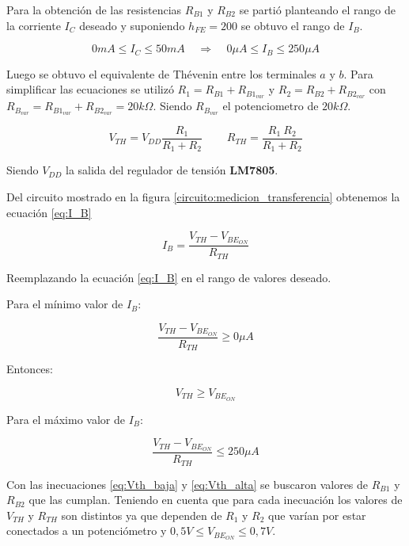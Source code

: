 \documentclass[10pt,spanish,a4paper,openany,notitlepage]{article}
\begin{document}
Para la obtención de las resistencias $R_{B1}$ y $R_{B2}$ se partió 
planteando el rango de la corriente $I_C$ deseado y suponiendo $h_{FE} = 200$ 
se obtuvo el rango de $I_B$.

\[ \displaystyle 0 \unit{mA} \leq I_C \leq 50\unit{mA} \ \ \ \ \ \Longrightarrow \ \ \ \ \  0 \unit{\mu A} \leq I_B \leq 250 \unit{\mu A} \]

Luego se obtuvo el equivalente de Thévenin entre los terminales $a$ y $b$. 
Para simplificar las ecuaciones se utilizó $R_1 = R_{B1} + R_{B1_{var}}$ y 
$R_2 = R_{B2} + R_{B2_{var}}$ con $R_{B_{var}} = R_{B1_{var}} + R_{B2_{var}} = 20 \unit{k\Omega}$. 
Siendo $R_{B_{var}}$ el potenciometro de $20 \unit{k\Omega}$.

\[ \displaystyle V_{TH} = V_{DD} \frac{R_1}{R_1 + R_2}\ \ \ \ \ \ \ \ \ \ R_{TH} = \frac{R_1\ R_2}{R_1 + R_2}\]

Siendo $V_{DD}$ la salida del regulador de tensión \textbf{LM7805}. 

Del circuito mostrado en la figura \ref{circuito:medicion_transferencia} 
obtenemos la ecuación \ref{eq:I_B}

\begin{equation}
\displaystyle I_B = \frac{V_{TH} - V_{BE_{ON}}}{R_{TH}}
\label{eq:I_B}
\end{equation}

Reemplazando la ecuación \ref{eq:I_B} en el rango de valores deseado.

Para el mínimo valor de $I_B$:

\[ \displaystyle \frac{V_{TH} - V_{BE_{ON}}}{R_{TH}} \geq 0 \unit{\mu A} \]

Entonces:

\begin{equation}
V_{TH} \geq V_{BE_{ON}}
\label{eq:Vth_baja}
\end{equation}

Para el máximo valor de $I_B$:

\begin{equation}
\frac{V_{TH} - V_{BE_{ON}}}{R_{TH}} \leq 250 \unit{\mu A}
\label{eq:Vth_alta}
\end{equation}

Con las inecuaciones \ref{eq:Vth_baja} y \ref{eq:Vth_alta} se buscaron 
valores de $R_{B1}$ y $R_{B2}$ que las cumplan. Teniendo en cuenta que 
para cada inecuación los valores de $V_{TH}$ y $R_{TH}$ son distintos ya 
que dependen de $R_1$ y $R_2$ que varían por estar conectados a un 
potenciómetro y $0,5 \unit{V} \leq V_{BE_{ON}} \leq 0,7 \unit{V}$.\\
\end{document}
